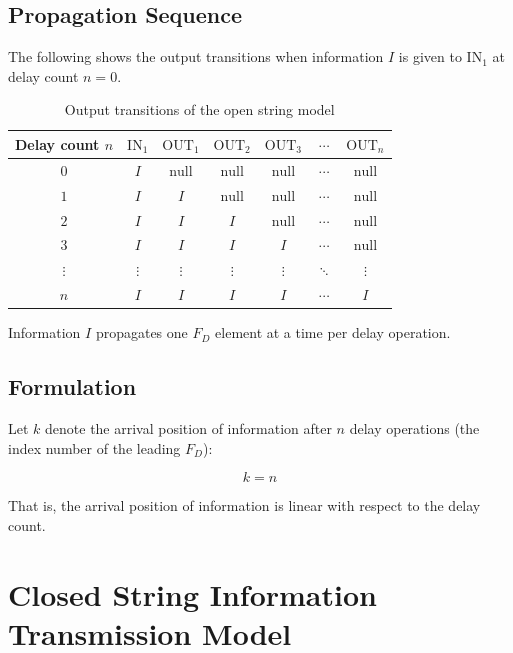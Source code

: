 \documentclass[12pt,a4paper]{article}
\begin{document}
\subsection{Propagation Sequence}

The following shows the output transitions when information $I$ is given to $\mathrm{IN}_1$ at delay count $n = 0$.

\begin{table}[htbp]
  \centering
  \caption{Output transitions of the open string model}
  \begin{tabular}{ccccccc}
    \toprule
    Delay count $n$ & $\mathrm{IN}_1$ & $\mathrm{OUT}_1$ & $\mathrm{OUT}_2$ & $\mathrm{OUT}_3$ & $\cdots$ & $\mathrm{OUT}_n$ \\
    \midrule
    $0$ & $I$ & $\mathrm{null}$ & $\mathrm{null}$ & $\mathrm{null}$ & $\cdots$ & $\mathrm{null}$ \\
    $1$ & $I$ & $I$ & $\mathrm{null}$ & $\mathrm{null}$ & $\cdots$ & $\mathrm{null}$ \\
    $2$ & $I$ & $I$ & $I$ & $\mathrm{null}$ & $\cdots$ & $\mathrm{null}$ \\
    $3$ & $I$ & $I$ & $I$ & $I$ & $\cdots$ & $\mathrm{null}$ \\
    $\vdots$ & $\vdots$ & $\vdots$ & $\vdots$ & $\vdots$ & $\ddots$ & $\vdots$ \\
    $n$ & $I$ & $I$ & $I$ & $I$ & $\cdots$ & $I$ \\
    \bottomrule
  \end{tabular}
\end{table}

Information $I$ propagates one $F_D$ element at a time per delay operation.

\subsection{Formulation}

Let $k$ denote the arrival position of information after $n$ delay operations (the index number of the leading $F_D$):

\begin{equation}
  k = n
\end{equation}

That is, the arrival position of information is linear with respect to the delay count.

\section{Closed String Information Transmission Model}
\end{document}

